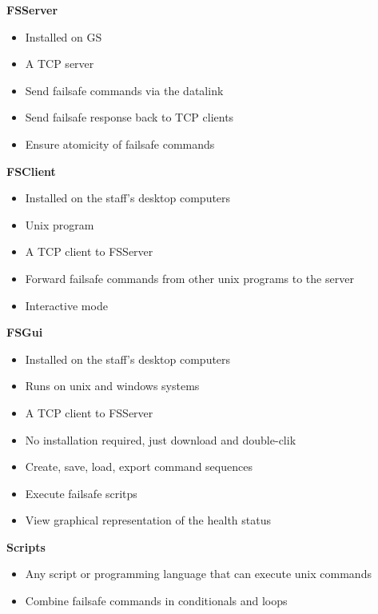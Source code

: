 \textbf{FSServer}
\begin{itemize}
	\item Installed on GS
	\item A TCP server
	\item Send failsafe commands via the datalink
	\item Send failsafe response back to TCP clients
	\item Ensure atomicity of failsafe commands
\end{itemize}

\textbf{FSClient}
\begin{itemize}
	\item Installed on the staff's desktop computers
	\item Unix program
	\item A TCP client to FSServer
	\item Forward failsafe commands from other unix programs to the server
	\item Interactive mode
\end{itemize}

\textbf{FSGui}
\begin{itemize}
	\item Installed on the staff's desktop computers
	\item Runs on unix and windows systems
	\item A TCP client to FSServer
	\item No installation required, just download and double-clik
	\item Create, save, load, export command sequences
	\item Execute failsafe scritps
	\item View graphical representation of the health status
\end{itemize}

\textbf{Scripts}
\begin{itemize}
	\item Any script or programming language that can execute unix commands
	\item Combine failsafe commands in conditionals and loops
\end{itemize}

